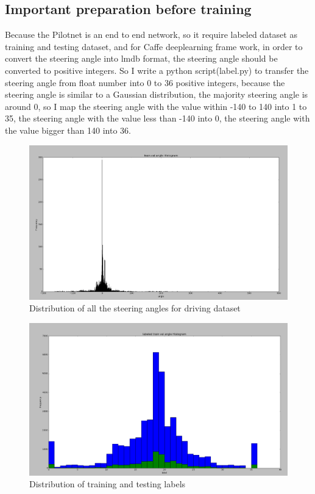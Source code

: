 \documentclass[conference]{IEEEtran}
\begin{document}
\subsection{Important preparation before training}


Because the Pilotnet is an end to end network, so it require labeled dataset as training and testing dataset, and for Caffe deeplearning frame work, in order to convert the steering angle into lmdb format, the steering angle should be converted to positive integers. So I write a python script(label.py) to transfer the steering angle from float number into 0 to 36 positive integers, because the steering angle is similar to a Gaussian distribution, the majority steering angle is around 0, so I map the steering angle with the value within -140 to 140 into 1 to 35, the steering angle with the value less than -140 into 0, the steering angle with the value bigger than 140 into 36.


\begin{figure}[h]
	\begin{center}		
		\includegraphics[width=0.8\linewidth]{fig4.png}
	\end{center}
	\caption{Distribution of all the steering angles for driving dataset}
	\label{fig:long4}
\end{figure}

\begin{figure}[h]
	\begin{center}		
		\includegraphics[width=0.8\linewidth]{fig3.png}
	\end{center}
	\caption{Distribution of training and testing labels}
	\label{fig:long3}
\end{figure}
\end{document}
